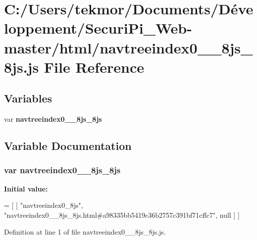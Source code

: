 \section{C\+:/\+Users/tekmor/\+Documents/\+Développement/\+Securi\+Pi\+\_\+\+Web-\/master/html/navtreeindex0\+\_\+\+\_\+8js\+\_\+8js.js File Reference}
\label{navtreeindex0____8js__8js_8js}
\subsection*{Variables}
\begin{DoxyCompactItemize}
\item 
var {\bf navtreeindex0\+\_\+\+\_\+8js\+\_\+8js}
\end{DoxyCompactItemize}


\subsection{Variable Documentation}
\subsubsection[{navtreeindex0\+\_\+\+\_\+8js\+\_\+8js}]{\setlength{\rightskip}{0pt plus 5cm}var navtreeindex0\+\_\+\+\_\+8js\+\_\+8js}\label{navtreeindex0____8js__8js_8js_ab4072ce464bd421564fe69f0e62030ea}
{\bfseries Initial value\+:}
\begin{DoxyCode}
=
[
    [ \textcolor{stringliteral}{"navtreeindex0\_8js"}, \textcolor{stringliteral}{"navtreeindex0\_\_8js\_8js.html#a98335bb5419c36b2757c391bf71cffc7"}, null ]
]
\end{DoxyCode}


Definition at line 1 of file navtreeindex0\+\_\+\+\_\+8js\+\_\+8js.\+js.

